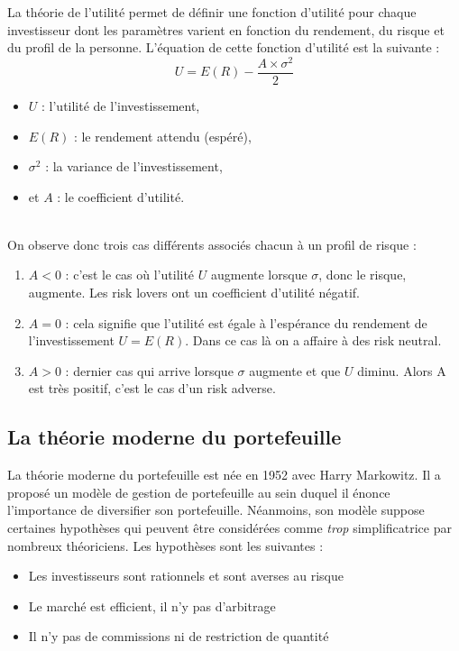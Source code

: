 La théorie de l'utilité permet de définir une fonction d'utilité pour chaque investisseur dont les paramètres varient en fonction du rendement, du risque et du profil de la personne. L'équation de cette fonction d'utilité est la suivante :
\[U = E(R) - \frac{A \times \sigma^2}{2} \]
\begin{itemize}
 \item $U$ : l'utilité de l'investissement,
 \item $E(R)$ : le rendement attendu (espéré),
 \item $\sigma^2$ : la variance de l'investissement,
 \item et $A$ : le coefficient d'utilité.
\end{itemize}

~\\ On observe donc trois cas différents associés chacun à un profil de risque :
\begin{enumerate}
 \item $A < 0$ : c'est le cas où l'utilité $U$ augmente lorsque $\sigma$, donc le risque, augmente. Les risk lovers ont un coefficient d'utilité négatif.
 \item $A = 0$ : cela signifie que l'utilité est égale à l'espérance du rendement de l'investissement $U = E(R)$. Dans ce cas là on a affaire à des risk neutral.
 \item $A > 0$ : dernier cas qui arrive lorsque $\sigma$ augmente et que $U$ diminu. Alors A est très positif, c'est le cas d'un risk adverse.
\end{enumerate}

\subsection{La théorie moderne du portefeuille}
La théorie moderne du portefeuille est née en 1952 avec Harry Markowitz. Il a proposé un modèle de gestion de portefeuille au sein duquel il énonce l'importance de diversifier son portefeuille.
Néanmoins, son modèle suppose certaines hypothèses qui peuvent être considérées comme \textit{trop} simplificatrice par nombreux théoriciens. Les hypothèses sont les suivantes :
\begin{itemize}
 \item Les investisseurs sont rationnels et sont averses au risque
 \item Le marché est efficient, il n'y pas d'arbitrage
 \item Il n'y pas de commissions ni de restriction de quantité
\end{itemize}

